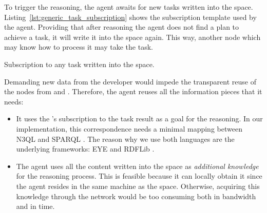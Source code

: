 To trigger the reasoning, the agent awaits for new tasks written into the space.
Listing~\ref{lst:generic_task_subscription} shows the subscription template used by the agent.
Providing that after reasoning the agent does not find a plan to achieve a task, it will write it into the space again.
This way, another node which may know how to process it may take the task. %


\begin{listing}
  
  \caption{Subscription to any task written into the space.}
  \label{lst:generic_task_subscription}
\end{listing}


Demanding new data from the developer would impede the transparent reuse of the nodes from \implSpace{} and \implRest{}.
Therefore, the agent reuses all the information pieces that it needs:
\begin{itemize}
  \item It uses the \nodeConsSpace{}'s subscription to the task result as a goal for the reasoning.
	In our implementation, this correspondence needs a minimal mapping between N3QL  and SPARQL .
	The reason why we use both languages are the underlying frameworks: EYE  and RDFLib .
	
  \item The agent uses all the content written into the space as \emph{additional knowledge} for the reasoning process.
	This is feasible because it can locally obtain it since the agent resides in the same machine as the space.
	Otherwise, acquiring this knowledge through the network would be too consuming both in bandwidth and in time.
\end{itemize}


